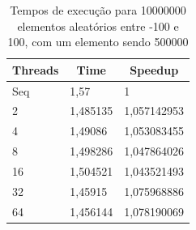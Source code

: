 \documentclass[a4paper]{report}
\begin{document}
\begin{table}[h]
    \centering
    \begin{tabular}{|l|l|l|}
        \hline
        \multicolumn{1}{|c|}{Threads} & \multicolumn{1}{c|}{Time} & \multicolumn{1}{c|}{Speedup} \\ \hline
        Seq                           & 1,57                      & 1                            \\ \hline
        2                             & 1,485135                  & 1,057142953                  \\ \hline
        4                             & 1,49086                   & 1,053083455                  \\ \hline
        8                             & 1,498286                  & 1,047864026                  \\ \hline
        16                            & 1,504521                  & 1,043521493                  \\ \hline
        32                            & 1,45915                   & 1,075968886                  \\ \hline
        64                            & 1,456144                  & 1,078190069                  \\ \hline
    \end{tabular}
    \caption{\label{tab:unbal}Tempos de execução para 10000000 elementos aleatórios entre -100 e 100,
    com um elemento sendo 500000}
\end{table}
\end{document}
